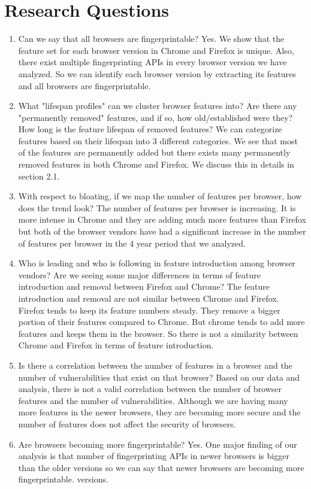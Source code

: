 \section{Research Questions}
\label{sec:introduction}

\begin{enumerate}
  
\item Can we say that all browsers are fingerprintable? Yes. We show
  that the feature set for each browser version in Chrome
  and Firefox is unique. Also, there exist multiple fingerprinting
  APIs in every browser version we have analyzed. So we can identify
  each browser version by extracting its features and all browsers are
  fingerprintable.
  
  \item What "lifespan profiles" can we cluster browser features into?
    Are there any "permanently removed" features, and if so, how
    old/established were they? How long is the feature lifespan of
    removed features? We can categorize features based on their
    lifespan into 3 different categories. We see that most of the
    features are permanently added but there exists many permanently
    removed features in both Chrome and Firefox. We discuss this in
    details in section 2.1.
    
  \item With respect to bloating, if we map the number of features per
    browser, how does the trend look? The number of features per
    browser is increasing. It is more intense in Chrome and they are
    adding much more features than Firefox but both of the browser
    vendors have had a significant increase in the number of features
    per browser in the 4 year period that we analyzed.
    
  \item Who is leading and who is following in feature introduction
    among browser vendors? Are we seeing some major differences in
    terms of feature introduction and removal between Firefox and
    Chrome? The feature introduction and removal are not similar
    between Chrome and Firefox. Firefox tends to keep its feature
    numbers steady. They remove a bigger portion of their features
    compared to Chrome. But chrome tends to add more features and
    keeps them in the browser. So there is not a similarity between
    Chrome and Firefox in terms of feature introduction.
    
  \item Is there a correlation between the number of features in a
    browser and the number of vulnerabilities that exist on that
    browser? Based on our data and analysis, there is not a valid
    correlation between the number of browser features and the number
    of vulnerabilities. Although we are having many more features in
    the newer browsers, they are becoming more secure and the number
    of features does not affect the security of browsers.
    
  \item Are browsers becoming more fingerprintable? Yes. One major
    finding of our analysis is that number of fingerprinting APIs in
    newer browsers is bigger than the older versions so we can say
    that newer browsers are becoming more fingerprintable. versions.
    
\end{enumerate}

